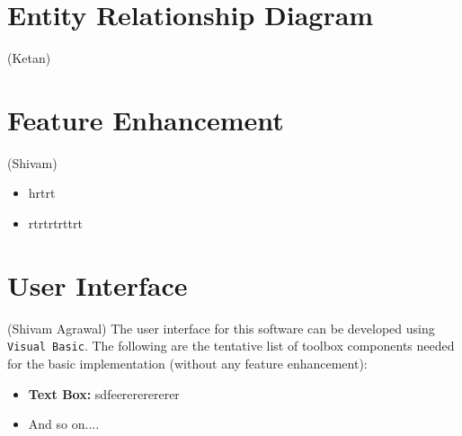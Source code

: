 \documentclass[12pt,a4paper]{article}
\begin{document}
\section{Entity Relationship Diagram}
(Ketan)

\section{Feature Enhancement}
(Shivam)
\begin{itemize}
    \item hrtrt
    \item rtrtrtrttrt
\end{itemize}
        
\section{User Interface}
(Shivam Agrawal)
	The user interface for this software can be developed using \texttt{Visual Basic}. The following are the tentative list of toolbox components needed for the basic implementation (without any feature enhancement):
    \begin{itemize}
        \item \textbf{Text Box:} sdfeerererererer
        \item And so on....
    \end{itemize}
\end{document}
